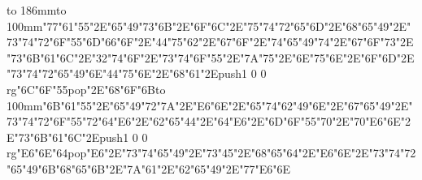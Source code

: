 \hbox to 186mm{\hsize=81mm\vbox to 100mm{\vfill\ipa\char"77\ipa\char"61\ipa\char"55\ipa\char"2E\ipa\char"65\ipa\char"49\ipa\char"73\ipa\char"6B\ipa\char"2E\ipa\char"6F\ipa\char"6C\ipa\char"2E\ipa\char"75\ipa\char"74\medskip\ipa\char"72\ipa\char"65\ipa\char"6D\ipa\char"2E\ipa\char"68\ipa\char"65\ipa\char"49\ipa\char"2E\ipa\char"73\ipa\char"74\ipa\char"72\ipa\char"6F\ipa\char"55\ipa\char"6D\medskip\ipa\char"66\ipa\char"6F\ipa\char"2E\ipa\char"44\ipa\char"75\ipa\char"62\ipa\char"2E\ipa\char"67\ipa\char"6F\ipa\char"2E\ipa\char"74\ipa\char"65\ipa\char"49\ipa\char"74\ipa\char"2E\ipa\char"67\ipa\char"6F\ipa\char"73\ipa\char"2E\ipa\char"73\ipa\char"6B\ipa\char"61\ipa\char"6C\ipa\char"2E\ipa\char"32\ipa\char"74\medskip\ipa\char"6F\ipa\char"2E\ipa\char"73\ipa\char"74\ipa\char"6F\ipa\char"55\ipa\char"2E\ipa\char"7A\ipa\char"75\ipa\char"2E\ipa\char"6E\ipa\char"75\ipa\char"6E\ipa\char"2E\ipa\char"6F\ipa\char"6D\ipa\char"2E\ipa\char"73\ipa\char"74\ipa\char"72\ipa\char"65\ipa\char"49\ipa\char"6E\medskip\ipa\char"44\ipa\char"75\ipa\char"6E\ipa\char"2E\ipa\char"68\ipa\char"61\ipa\char"2E\pdfcolorstack\match push{1 0 0 rg}\ipa\char"6C\ipa\char"6F\ipa\char"55\pdfcolorstack\match pop{}\ipa\char"2E\ipa\char"68\ipa\char"6F\ipa\char"6B\vfill}\hfill\vbox to 100mm{\vfill\ipa\char"6B\ipa\char"61\ipa\char"55\ipa\char"2E\ipa\char"65\ipa\char"49\ipa\char"72\ipa\char"7A\ipa\char"2E\ipa\char"E6\ipa\char"6E\ipa\char"2E\ipa\char"65\ipa\char"74\medskip\ipa\char"62\ipa\char"49\ipa\char"6E\ipa\char"2E\ipa\char"67\ipa\char"65\ipa\char"49\ipa\char"2E\ipa\char"73\ipa\char"74\ipa\char"72\ipa\char"6F\ipa\char"55\ipa\char"72\medskip\ipa\char"64\ipa\char"E6\ipa\char"2E\ipa\char"62\ipa\char"65\ipa\char"44\ipa\char"2E\ipa\char"64\ipa\char"E6\ipa\char"2E\ipa\char"6D\ipa\char"6F\ipa\char"55\ipa\char"70\ipa\char"2E\ipa\char"70\ipa\char"E6\ipa\char"6E\ipa\char"2E\ipa\char"73\ipa\char"6B\ipa\char"61\ipa\char"6C\ipa\char"2E\pdfcolorstack\match push{1 0 0 rg}\ipa\char"E6\ipa\char"6E\ipa\char"64\pdfcolorstack\match pop{}\medskip\ipa\char"E6\ipa\char"2E\ipa\char"73\ipa\char"74\ipa\char"65\ipa\char"49\ipa\char"2E\ipa\char"73\ipa\char"45\ipa\char"2E\ipa\char"68\ipa\char"65\ipa\char"64\ipa\char"2E\ipa\char"E6\ipa\char"6E\ipa\char"2E\ipa\char"73\ipa\char"74\ipa\char"72\ipa\char"65\ipa\char"49\ipa\char"6B\medskip\ipa\char"68\ipa\char"65\ipa\char"6B\ipa\char"2E\ipa\char"7A\ipa\char"61\ipa\char"2E\ipa\char"62\ipa\char"65\ipa\char"49\ipa\char"2E\ipa\char"77\ipa\char"E6\ipa\char"6E\vfill}}\eject
